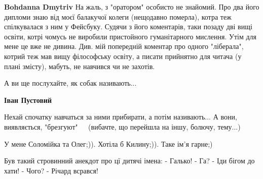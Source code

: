 \begin{itemize}
\begin{itemize}
\textbf{Bohdanna Dmytriv} На жаль, з "оратором" особисто не знайомий. Про два
його дипломи знаю від моєї балакучої колеги (нещодавно померла), котра теж
спілкувалася з ним у Фейсбуку. Судячи з його коментарів, таки позаду дві вищі
освіти, котрі чомусь не виробили пристойного гуманітарного мислення. Утім для
мене це вже не дивина. Див. мій попередній коментар про одного "ліберала",
котрий теж мав вищу філософську освіту, а писати прийнятно для читача (у плані
змісту), мабуть, не навчився чи не захотів.
\end{itemize}

 
А ви ще послухайте, як собак називають...

\begin{itemize}
 
\textbf{Іван Пустовий}

Нехай спочатку навчаться за ними прибирати, а потім називають... А вони,
виявляється, "брезгуют"🤢🤢🤢🤢 (вибачте, що перейшла на іншу, болючу, тему...)

\end{itemize}

 
У мене Соломійка та Олег;)). Хотіла б Килину;)). Таке ім'я гарне;)

 
Був такий стровинний анекдот про цї дитячі імена:
\obeycr
- Галько!
- Га?
- Іди бігом до хати!
- Чого?
- Річард всрався!
\restorecr

\begin{itemize}
 

\end{itemize}
\end{itemize}
